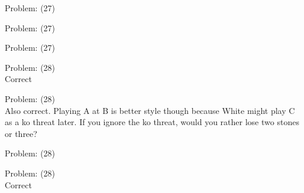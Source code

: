\documentclass[11pt]{article}
\begin{document}
\begin{minipage}[t]{0.5\textwidth}
  {\centering
  
  Problem: (27)\\
  
  }
\end{minipage}
\begin{minipage}[t]{0.5\textwidth}
  {\centering
  
  Problem: (27)\\
  
  }
\end{minipage}
\begin{minipage}[t]{0.5\textwidth}
  {\centering
  
  Problem: (27)\\
  
  }
\end{minipage}
\begin{minipage}[t]{0.5\textwidth}
  {\centering
  
  Problem: (28)\\
  Correct\\
  }
\end{minipage}
\begin{minipage}[t]{0.5\textwidth}
  {\centering
  
  Problem: (28)\\
  Also correct. Playing A at B is better style though because White might play C as a ko threat later. If you ignore the ko threat, would you rather lose two stones or three?\\
  }
\end{minipage}
\begin{minipage}[t]{0.5\textwidth}
  {\centering
  
  Problem: (28)\\
  
  }
\end{minipage}
\begin{minipage}[t]{0.5\textwidth}
  {\centering
  
  Problem: (28)\\
  Correct\\
  }
\end{minipage}
\end{document}
